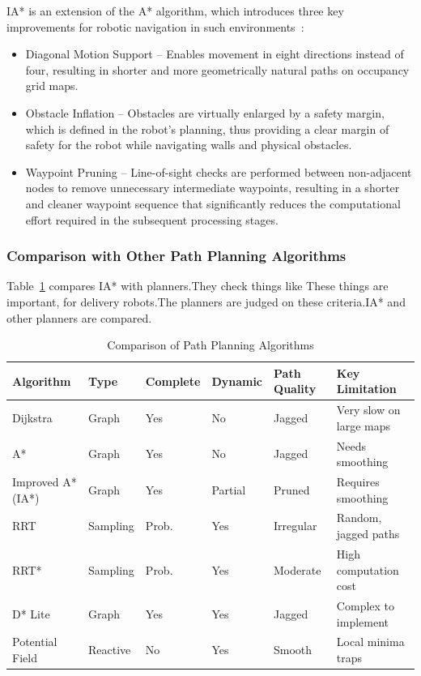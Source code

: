 IA* is an extension of the A* algorithm, which introduces three key improvements for robotic navigation in such environments~\cite{wang2021mobile}:
\begin{itemize}
\item Diagonal Motion Support -- Enables movement in eight directions instead of four, resulting in shorter and more geometrically natural paths on occupancy grid maps.
\item Obstacle Inflation -- Obstacles are virtually enlarged by a safety margin, which is defined in the robot's planning, thus providing a clear margin of safety for the robot while navigating walls and physical obstacles.
\item Waypoint Pruning -- Line-of-sight checks are performed between non-adjacent nodes to remove unnecessary intermediate waypoints, resulting in a shorter and cleaner waypoint sequence that significantly reduces the computational effort required in the subsequent processing stages.
\end{itemize}

\subsubsection{Comparison with Other Path Planning Algorithms}

Table~\ref{tab:path_planning_comparison} compares IA* with planners.They check things like
These things are important, for delivery robots.The planners are judged on these criteria.IA* and other planners are compared.
\begin{table}[htbp]
\centering
\small
\caption{Comparison of Path Planning Algorithms}
\label{tab:path_planning_comparison}
\begin{tabular}{|p{2cm}|p{1.6cm}|p{1.6cm}|p{1.6cm}|p{2cm}|p{3cm}|}
\hline
Algorithm & Type & Complete & Dynamic & Path Quality & Key Limitation \\
\hline
Dijkstra & Graph & Yes & No & Jagged & Very slow on large maps \\
\hline
A* & Graph & Yes & No & Jagged & Needs smoothing \\
\hline
Improved A* (IA*) & Graph & Yes & Partial & Pruned & Requires smoothing \\
\hline
RRT & Sampling & Prob. & Yes & Irregular & Random, jagged paths \\
\hline
RRT* & Sampling & Prob. & Yes & Moderate & High computation cost \\
\hline
D* Lite & Graph & Yes & Yes & Jagged & Complex to implement \\
\hline
Potential Field & Reactive & No & Yes & Smooth & Local minima traps \\
\hline
\end{tabular}
\end{table}

